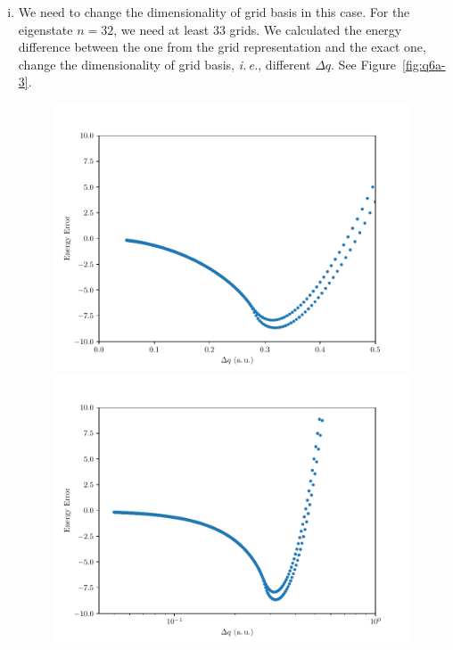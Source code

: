 \documentclass{article}
\newcommand{\ie}{\emph{i.\,e.}}
\begin{document}
\begin{enumerate}[1.]
\begin{enumerate}[(A)]
\begin{enumerate}[(i)]
      \item We need to change the dimensionality of grid basis in this case. For the eigenstate $n=32$, we need at least $33$ grids.
      We calculated the energy difference between the one from the grid representation and the exact one, change the dimensionality of grid basis, \ie, different $\Delta q$.
      See Figure~\ref{fig:q6a-3}.
      \begin{figure}[H]
        \centering
        \begin{minipage}{0.45\linewidth}
          \centering
          \includegraphics[width=\linewidth]{q6a-3.pdf}
        \end{minipage}
        \begin{minipage}{0.45\linewidth}
          \centering
          \includegraphics[width=\linewidth]{q6a-3l.pdf}

\end{minipage}
\end{figure}
\end{enumerate}
\end{enumerate}
\end{enumerate}
\end{document}
